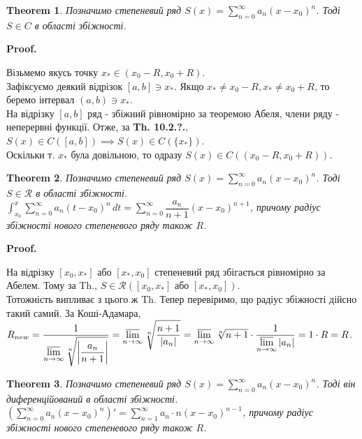 \documentclass[a4paper, 10pt]{article}
\makeatletter
\DeclareMathOperator*\uplim{\overline{lim}}
\def\huge{\displaystyle}
\def\qed{$\blacksquare$}
\theoremstyle{theoremdd}
\newtheorem{theorem}{Theorem}[subsection]
\theoremstyle{theoremdd}
\theoremstyle{theoremdd}
\theoremstyle{theoremdd}
\theoremstyle{theoremdd}
\theoremstyle{theoremdd}
\theoremstyle{theoremdd}
\theoremstyle{theoremdd}
\renewenvironment{proof}[1][Proof.\\]{\par
\pushQED{\hfill \qed}%
\normalfont \topsep6\p@\@plus6\p@\relax
\trivlist
\item\relax
{\bfseries
#1\@addpunct{.}}\hspace\labelsep\ignorespaces
}{%
\popQED\endtrivlist\@endpefalse
}
\makeatother
\begin{document}
\begin{theorem}
Позначимо степеневий ряд $\huge S(x) = \sum_{n=0}^\infty a_n(x-x_0)^n$. Тоді $S \in C$ в області збіжності.
\end{theorem}

\begin{proof}
Візьмемо якусь точку $x_* \in (x_0-R,x_0+R)$.\\
Зафіксуємо деякий відрізок $[a,b] \ni x_*$. Якщо $x_* \neq x_0 - R, x_* \neq x_0 + R$, то беремо інтервал $(a,b) \ni x_*$.\\
На відрізку $[a,b]$ ряд - збіжний рівномірно за теоремою Абеля, члени ряду - неперервні функції. Отже, за \textbf{Th. 10.2.?.}, $S(x) \in C([a,b]) \implies S(x) \in C(\{x_*\})$.\\
Оскільки т. $x_*$ була довільною, то одразу $S(x) \in C((x_0-R, x_0+R))$.
\end{proof}

\begin{theorem}
Позначимо степеневий ряд $\huge S(x) = \sum_{n=0}^\infty a_n(x-x_0)^n$. Тоді $S \in \mathcal{R}$ в області збіжності.\\
$\huge\int_{x_0}^x \huge\sum_{n=0}^\infty a_n (t-x_0)^n\,dt = \sum_{n=0}^\infty \dfrac{a_n}{n+1}(x-x_0)^{n+1}$, причому радіус збіжності нового степеневого ряду також $R$.
\end{theorem}

\begin{proof}
На відрізку $[x_0,x_*]$ або $[x_*,x_0]$ степеневий ряд збігається рівномірно за Абелем. Тому за Th., $S \in \mathcal{R}([x_0,x_*] \text{ або } [x_*,x_0])$.\\
Тотожність випливає з цього ж Th. Тепер перевіримо, що радіус збіжності дійсно такий самий. За Коші-Адамара,\\
$R_{new} = \huge \dfrac{1}{\huge\uplim_{n \to \infty} \sqrt[n]{\abs{\dfrac{a_n}{n+1}}} } = \uplim_{n \to \infty} \sqrt[n]{\dfrac{n+1}{|a_n|}} = \uplim_{n \to \infty} \sqrt[n]{n+1} \cdot \dfrac{1}{\huge\uplim_{n \to \infty} |a_n|} = 1 \cdot R = R$.
\end{proof}

\begin{theorem}
Позначимо степеневий ряд $\huge S(x) = \sum_{n=0}^\infty a_n(x-x_0)^n$. Тоді він диференційований в області збіжності.\\
$\huge \left( \sum_{n=0}^\infty a_n(x-x_0)^n \right)' = \sum_{n=1}^\infty a_n\cdot n(x-x_0)^{n-1}$, причому радіус збіжності нового степеневого ряду також $R$.
\end{theorem}
\end{document}
